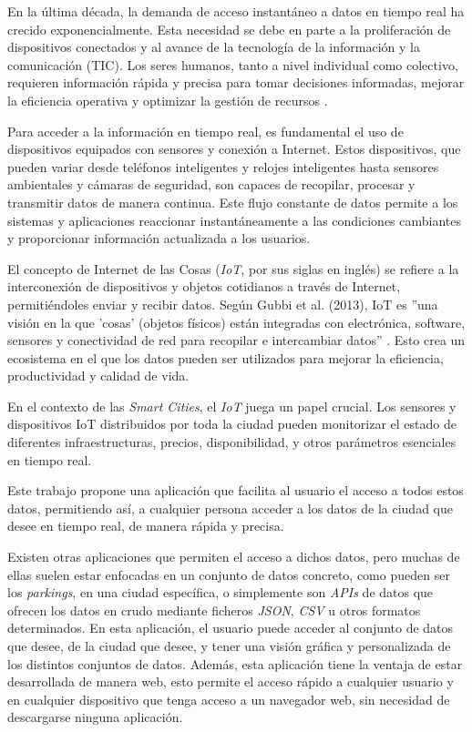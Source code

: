 \begin{comment}
Descripción del contenido del trabajo y del estructura de la memoria y del resto de materiales entregados.
\end{comment}

En la última década, la demanda de acceso instantáneo a datos en tiempo real ha crecido exponencialmente. Esta necesidad se debe en parte a la proliferación de dispositivos conectados y al avance de la tecnología de la información y la comunicación (TIC). Los seres humanos, tanto a nivel individual como colectivo, requieren información rápida y precisa para tomar decisiones informadas, mejorar la eficiencia operativa y optimizar la gestión de recursos \cite{khajeh2020, patel2016, gubbi2013}.

Para acceder a la información en tiempo real, es fundamental el uso de dispositivos equipados con sensores y conexión a Internet. Estos dispositivos, que pueden variar desde teléfonos inteligentes y relojes inteligentes hasta sensores ambientales y cámaras de seguridad, son capaces de recopilar, procesar y transmitir datos de manera continua. Este flujo constante de datos permite a los sistemas y aplicaciones reaccionar instantáneamente a las condiciones cambiantes y proporcionar información actualizada a los usuarios.

El concepto de Internet de las Cosas (\textit{IoT}, por sus siglas en inglés) se refiere a la interconexión de dispositivos y objetos cotidianos a través de Internet, permitiéndoles enviar y recibir datos. Según Gubbi et al. (2013), IoT es ''una visión en la que 'cosas' (objetos físicos) están integradas con electrónica, software, sensores y conectividad de red para recopilar e intercambiar datos'' \cite{gubbi2013}. Esto crea un ecosistema en el que los datos pueden ser utilizados para mejorar la eficiencia, productividad y calidad de vida.

En el contexto de las \textit{Smart Cities}, el \textit{IoT} juega un papel crucial. Los sensores y dispositivos IoT distribuidos por toda la ciudad pueden monitorizar el estado de diferentes infraestructuras, precios, disponibilidad, y otros parámetros esenciales en tiempo real.

Este trabajo propone una aplicación que facilita al usuario el acceso a todos estos datos, permitiendo así, a cualquier persona acceder a los datos de la ciudad que desee en tiempo real, de manera rápida y precisa. 

Existen otras aplicaciones que permiten el acceso a dichos datos, pero muchas de ellas suelen estar enfocadas en un conjunto de datos concreto, como pueden ser los \textit{parkings}, en una ciudad específica, o simplemente son \textit{APIs} de datos que ofrecen los datos en crudo mediante ficheros \textit{JSON}, \textit{CSV} u otros formatos determinados.
En esta aplicación, el usuario puede acceder al conjunto de datos que desee, de la ciudad que desee, y tener una visión gráfica y personalizada de los distintos conjuntos de datos. Además, esta aplicación tiene la ventaja de estar desarrollada de manera web, esto permite el acceso rápido a cualquier usuario y en cualquier dispositivo que tenga acceso a un navegador web, sin necesidad de descargarse ninguna aplicación.

